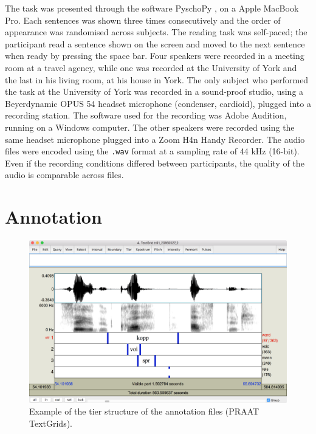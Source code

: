 \documentclass[11pt,a4paper,openany]{memoir}\usepackage[]{graphicx}\usepackage[]{color}
\begin{document}
The task was presented through the software PyschoPy \citep{peirce2009}, on a Apple MacBook Pro.
Each sentences was shown three times consecutively and the order of appearance was randomised across subjects.
The reading task was self-paced; the participant read a sentence shown on the screen and moved to the next sentence when ready by pressing the space bar.
Four speakers were recorded in a meeting room at a travel agency, while one was recorded at the University of York and the last in his living room, at his house in York.
The only subject who performed the task at the University of York was recorded in a sound-proof studio, using a Beyerdynamic OPUS 54 headset microphone (condenser, cardioid), plugged into a recording station.
The software used for the recording was Adobe Audition, running on a Windows computer.
The other speakers were recorded using the same headset microphone plugged into a Zoom H4n Handy Recorder.
The audio files were encoded using the \texttt{.wav} format at a sampling rate of 44 kHz (16-bit).
Even if the recording conditions differed between participants, the quality of the audio is comparable across files.

\section{Annotation}

\begin{figure}
\centering
\includegraphics[width=\linewidth]{textgrid}
\caption{Example of the tier structure of the annotation files (PRAAT TextGrids).}
\label{f:textgrid}
\end{figure}
\end{document}
